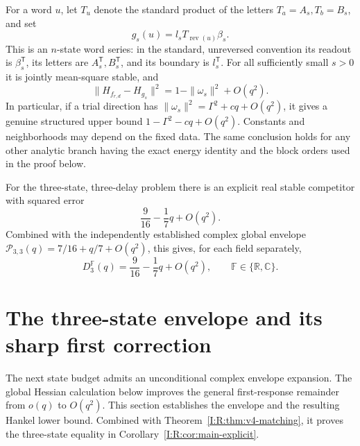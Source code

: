 \begin{theorem}
\begin{equation}
\end{equation}
For a word $u$, let $T_u$ denote the standard product of the letters
$T_a=A_s,T_b=B_s$, and set
\begin{equation}
 g_s(u)=l_sT_{\operatorname{rev}(u)}\beta_s.
 \label{I:R:eq:v4-match-series}
\end{equation}
This is an $n$-state word series: in the standard, unreversed convention
its readout is $\beta_s^{\mathsf T}$, its letters are
$A_s^{\mathsf T},B_s^{\mathsf T}$, and its boundary is
$l_s^{\mathsf T}$.  For all sufficiently small $s>0$ it is jointly
mean-square stable, and
\begin{equation}
 \boxed{\displaystyle
 \|H_{f_{r,d}}-H_{g_s}\|^2
     =1-\|\omega_s\|^2+O(q^2).}
 \label{I:R:eq:v4-match-conclusion}
\end{equation}
In particular, if a trial direction has
$\|\omega_s\|^2=\Gamma^2+cq+O(q^2)$, it gives a genuine structured
upper bound $1-\Gamma^2-cq+O(q^2)$.  Constants and neighborhoods may
depend on the fixed data.  The same conclusion holds for any other
analytic branch having the exact energy identity and the block orders
used in the proof below.
\end{theorem}



\begin{corollary}
\label{I:R:cor:v4-three-state-upper}
For the three-state, three-delay problem there is an explicit real
stable competitor with squared error
\[
 \frac9{16}-\frac17q+O(q^2).
\]
Combined with the independently established complex global envelope
$\mathcal P_{3,3}(q)=7/16+q/7+O(q^2)$, this gives, for each field
separately,
\[
 D_3^{\mathbb F}(q)=\frac9{16}-\frac17q+O(q^2),
 \qquad\mathbb F\in\{\mathbb R,\mathbb C\}.
\]
\end{corollary}









\section{The three-state envelope and its sharp first correction}
\label{I:R:sec:three-state}

The next state budget admits an unconditional complex envelope expansion.
The global Hessian calculation below improves the general first-response
remainder from $o(q)$ to $O(q^2)$.  This section establishes the envelope
and the resulting Hankel lower bound. Combined with
Theorem~\ref{I:R:thm:v4-matching}, it proves the three-state equality in
Corollary~\ref{I:R:cor:main-explicit}.

